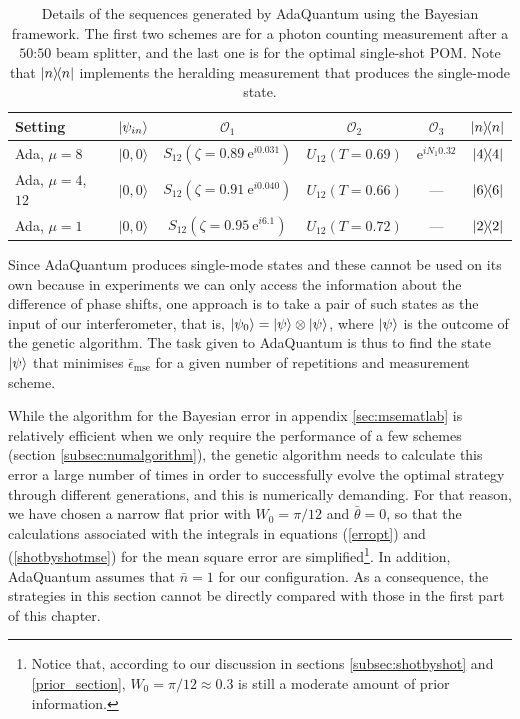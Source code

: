 \begin{table} [t]
\centering
{\renewcommand{\arraystretch}{1.5} 
\begin{tabular}{|l|c|c|c|c|c|}
\hline
Setting & $\ket{\psi_{in}}$ & $\mathcal{O}_1$ & $\mathcal{O}_2$ & $\mathcal{O}_3$ & $\ketbra{n}$ \\
\hline
Ada, $\mu = 8$ & $|0,0\rangle$ & $S_{12}(\zeta = 0.89~\mathrm{e}^{i 0.031})$ & $U_{12}(T=0.69)$ &  $\mathrm{e}^{i N_1 0.32}$ & $\ketbra{4}$  \\
Ada, $\mu = 4$, $12$ & $|0,0\rangle$ & $S_{12}(\zeta = 0.91~\mathrm{e}^{i 0.040})$ & $U_{12}(T=0.66)$ & --- & $\ketbra{6}$ \\
Ada, $\mu = 1$ & $|0,0\rangle$ & $S_{12}(\zeta = 0.95~\mathrm{e}^{i 6.1})$ & $U_{12}(T=0.72)$ & --- & $\ketbra{2}$\\
\hline
\end{tabular}}
\caption[Sequences of quantum operations generated by AdaQuantum]{Details of the sequences generated by AdaQuantum using the Bayesian framework. The first two schemes are for a photon counting measurement after a $50$:$50$ beam splitter, and the last one is for the optimal single-shot POM. Note that $\ketbra{n}$ implements the heralding measurement that produces the single-mode state.}
\label{toolbox_summary}
\end{table}

Since AdaQuantum produces single-mode states and these cannot be used on its own because in experiments we can only access the information about the difference of phase shifts, one approach is to take a pair of such states as the input of our interferometer, that is, $\ket{\psi_0} = \ket{\psi}\otimes \ket{\psi}$, where $\ket{\psi}$ is the outcome of the genetic algorithm. The task given to AdaQuantum is thus to find the state $\ket{\psi}$ that minimises $\bar{\epsilon}_{\mathrm{mse}}$ for a given number of repetitions and measurement scheme. 

While the algorithm for the Bayesian error in appendix \ref{sec:msematlab} is relatively efficient when we only require the performance of a few schemes (section \ref{subsec:numalgorithm}), the genetic algorithm needs to calculate this error a large number of times in order to successfully evolve the optimal strategy through different generations, and this is numerically demanding. For that reason, we have chosen a narrow flat prior with $W_0 = \pi/12$ and $\bar{\theta} = 0$, so that the calculations associated with the integrals in equations (\ref{erropt}) and (\ref{shotbyshotmse}) for the mean square error are simplified\footnote{Notice that, according to our discussion in sections \ref{subsec:shotbyshot} and \ref{prior_section}, $W_0 = \pi/12 \approx 0.3$ is still a moderate amount of prior information.}. In addition, AdaQuantum assumes that $\bar{n} = 1$ for our configuration. As a consequence, the strategies in this section cannot be directly compared with those in the first part of this chapter.

